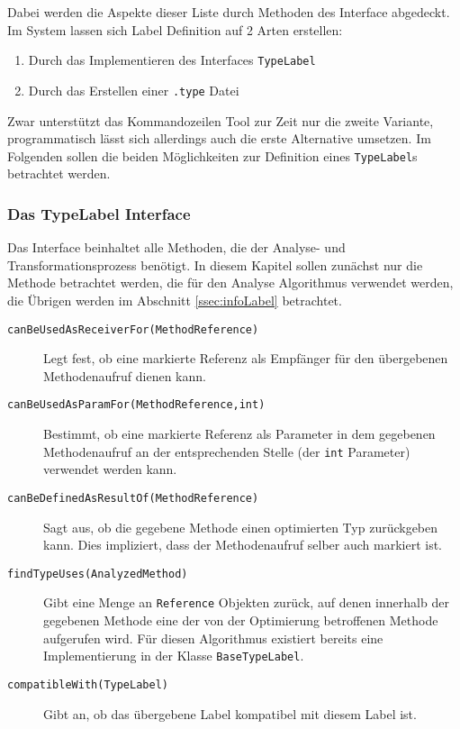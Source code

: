 Dabei werden die Aspekte dieser Liste durch Methoden des Interface abgedeckt. 
Im System lassen sich Label Definition auf 2 Arten erstellen:

\begin{enumerate} 
	\item Durch das Implementieren des Interfaces \texttt{TypeLabel}
	\item Durch das Erstellen einer \texttt{.type} Datei
\end{enumerate}

Zwar unterstützt das Kommandozeilen Tool zur Zeit nur die zweite Variante,
programmatisch lässt sich allerdings auch die erste Alternative umsetzen. Im 
Folgenden sollen die beiden Möglichkeiten zur Definition eines \texttt{TypeLabel}s
betrachtet werden.

\subsubsection{Das TypeLabel Interface} \label{sssec:typeLabel}

Das Interface beinhaltet alle Methoden, die der Analyse- und Transformationsprozess
benötigt. In diesem Kapitel sollen zunächst nur die Methode betrachtet werden, die
für den Analyse Algorithmus verwendet werden, die Übrigen werden im Abschnitt 
\ref{ssec:infoLabel} betrachtet. 

\begin{description}
	\item[\texttt{canBeUsedAsReceiverFor(MethodReference)}] Legt fest, ob eine 
	markierte Referenz als Empfänger für den übergebenen Methodenaufruf dienen kann.
	\item[\texttt{canBeUsedAsParamFor(MethodReference,int)}] Bestimmt, ob eine 
	markierte Referenz als Parameter in dem gegebenen Methodenaufruf an der 
	entsprechenden Stelle (der \texttt{int} Parameter) verwendet werden kann.
	\item[\texttt{canBeDefinedAsResultOf(MethodReference)}] Sagt aus, ob die 
	gegebene Methode einen optimierten Typ zurückgeben kann. Dies impliziert, dass
	der Methodenaufruf selber auch markiert ist.
	\item[\texttt{findTypeUses(AnalyzedMethod)}] Gibt eine Menge an \texttt{Reference}
	Objekten zurück, auf denen innerhalb der gegebenen Methode eine der von 
	der Optimierung betroffenen Methode aufgerufen wird. Für diesen Algorithmus 
	existiert bereits eine Implementierung in der Klasse \texttt{BaseTypeLabel}.
	\item[\texttt{compatibleWith(TypeLabel)}] Gibt an, ob das übergebene Label 
	kompatibel mit diesem Label ist.
\end{description}

